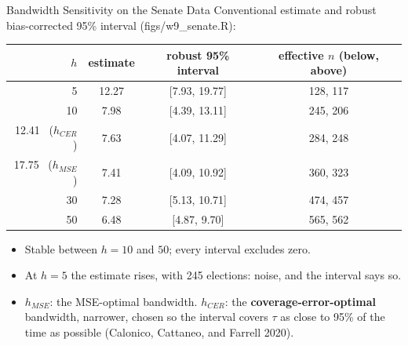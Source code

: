 \documentclass[aspectratio=169,11pt,xcolor=dvipsnames]{beamer}
\newcommand{\srcp}[1]{{\scriptsize\color{gray}(#1)}}
\begin{document}
\begin{frame}{Bandwidth Sensitivity on the Senate Data}
Conventional estimate and robust bias-corrected 95\% interval \srcp{figs/w9\_senate.R}:
\vskip4pt
\begin{center}\small
\renewcommand{\arraystretch}{1.12}
\begin{tabular}{@{}rccc@{}}
\toprule
$h$ & estimate & robust 95\% interval & effective $n$ (below, above) \\
\midrule
5 & 12.27 & [7.93, 19.77] & 128, 117 \\
10 & 7.98 & [4.39, 13.11] & 245, 206 \\
12.41 \ ($h_{CER}$) & 7.63 & [4.07, 11.29] & 284, 248 \\
17.75 \ ($h_{MSE}$) & 7.41 & [4.09, 10.92] & 360, 323 \\
30 & 7.28 & [5.13, 10.71] & 474, 457 \\
50 & 6.48 & [4.87, 9.70] & 565, 562 \\
\bottomrule
\end{tabular}
\end{center}
\vskip3pt
\begin{itemize}\itemsep2pt
  \item Stable between $h = 10$ and $50$; every interval excludes zero.
  \item At $h = 5$ the estimate rises, with 245 elections: noise, and the
        interval says so.
  \item $h_{MSE}$: the MSE-optimal bandwidth. $h_{CER}$: the \textbf{coverage-error-optimal}
        bandwidth, narrower, chosen so the interval covers $\tau$ as close to 95\% of the
        time as possible \srcp{Calonico, Cattaneo, and Farrell 2020}.
\end{itemize}
\end{frame}
\end{document}

